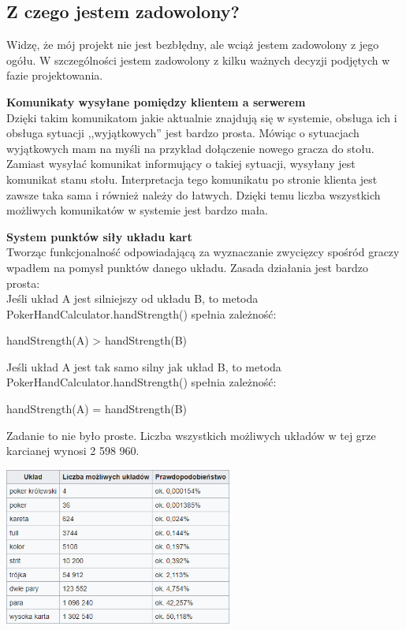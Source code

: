 \documentclass{article}
\begin{document}
    \subsection{Z czego jestem zadowolony?}
        Widzę, że mój projekt nie jest bezbłędny, ale wciąż jestem zadowolony z jego ogółu.
        W szczególności jestem zadowolony z kilku ważnych decyzji podjętych w fazie projektowania.
        
        \vspace{2mm}
        \textbf{Komunikaty wysyłane pomiędzy klientem a serwerem}\\
            Dzięki takim komunikatom jakie aktualnie znajdują się w systemie, obsługa ich i obsługa sytuacji ,,wyjątkowych'' jest bardzo prosta.
            Mówiąc o sytuacjach wyjątkowych mam na myśli na przykład dołączenie nowego gracza do stołu.
            Zamiast wysyłać komunikat informujący o takiej sytuacji, wysyłany jest komunikat stanu stołu.
            Interpretacja tego komunikatu po stronie klienta jest zawsze taka sama i również należy do łatwych.
            Dzięki temu liczba wszystkich możliwych komunikatów w systemie jest bardzo mała.
        
        \vspace{2mm}
        \textbf{System punktów siły układu kart}\\
            Tworząc funkcjonalność odpowiadającą za wyznaczanie zwycięzcy spośród graczy wpadłem na pomysł punktów danego układu.
            Zasada działania jest bardzo prosta:\\
            Jeśli układ A jest silniejszy od układu B, to metoda PokerHandCalculator.handStrength() spełnia zależność:\\
            \begin{center}
                handStrength(A) > handStrength(B)
            \end{center} 
            Jeśli układ A jest tak samo silny jak układ B, to metoda PokerHandCalculator.handStrength() spełnia zależność:\\
            \begin{center}
                handStrength(A) = handStrength(B)
            \end{center}
            
            Zadanie to nie było proste. Liczba wszystkich możliwych układów w tej grze karcianej wynosi 2 598 960.
            \begin{center}
                \includegraphics[width=75mm]{poker_hands.png}
            \end{center}
            
\end{document}
